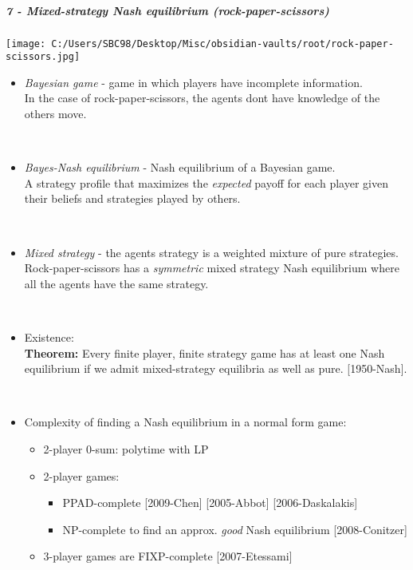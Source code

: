 \documentclass[
]{article}
\providecommand{\tightlist}{%
  \setlength{\itemsep}{0pt}\setlength{\parskip}{0pt}}
\begin{document}
\subparagraph{7 - Mixed-strategy Nash equilibrium
(rock-paper-scissors)}\label{mixed-strategy-nash-equilibrium-rock-paper-scissors}

\texttt{[image: C:/Users/SBC98/Desktop/Misc/obsidian-vaults/root/rock-paper-scissors.jpg]}

\begin{itemize}
\item
  {\emph{Bayesian game}} - game in which players have incomplete
  information.\\
  In the case of rock-paper-scissors, the agents don\textquotesingle t
  have knowledge of the other\textquotesingle s move.\\
  \strut \\
\item
  {\emph{Bayes-Nash equilibrium}} - Nash equilibrium of a Bayesian
  game.\\
  A strategy profile that maximizes the \emph{expected} payoff for each
  player given their beliefs and strategies played by others.\\
  \strut \\
\item
  {\emph{Mixed strategy}} - the agent\textquotesingle s strategy is a
  weighted mixture of pure strategies.\\
  Rock-paper-scissors has a \emph{symmetric} mixed strategy Nash
  equilibrium where all the agents have the same strategy.\\
  \strut \\
\item
  Existence:\\
  {\textbf{Theorem:}} Every finite player, finite strategy game has at
  least one Nash equilibrium if we admit mixed-strategy equilibria as
  well as pure. {{[}1950-Nash{]}}.\\
  \strut \\
\item
  Complexity of finding a Nash equilibrium in a normal form game:

  \begin{itemize}
  \tightlist
  \item
    2-player 0-sum: polytime with LP
  \item
    2-player games:

    \begin{itemize}
    \tightlist
    \item
      PPAD-complete {{[}2009-Chen{]} {[}2005-Abbot{]}
      {[}2006-Daskalakis{]}}
    \item
      NP-complete to find an approx. \emph{good} Nash equilibrium
      {{[}2008-Conitzer{]}}
    \end{itemize}
  \item
    3-player games are FIXP-complete {{[}2007-Etessami{]}}
  \end{itemize}
\end{itemize}
\end{document}
